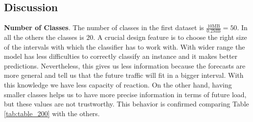 \documentclass[12pt]{article}
\begin{document}
\begin{table}[h!]
	\centering
	\caption{Results for \textbf{500\_D\_10}}
	\label{tab:table_500D10}
\end{table}

\restoregeometry


\subsection{Discussion}


\hspace{14pt} \textbf{Number of Classes}. 
The number of classes in the first dataset is $ \frac{10 \text{MB} } { 0.2 \text{MB}}  = 50$. 
In all the others the classes is $20$. 
A crucial design feature is to choose the right size of the intervals with which the classifier has to work with.
With wider range the model has less difficulties to correctly classify an instance and it makes better predictions. 
Nevertheless, this gives us less information because the forecasts are more general and tell us that the future traffic will fit in a bigger interval. With this knowledge we have less capacity of reaction. 
On the other hand, having smaller classes helps us to have more precise information in terms of future load, but these values are not trustworthy.
This behavior is confirmed comparing Table \ref{tab:table_200} with the others.
\end{document}

